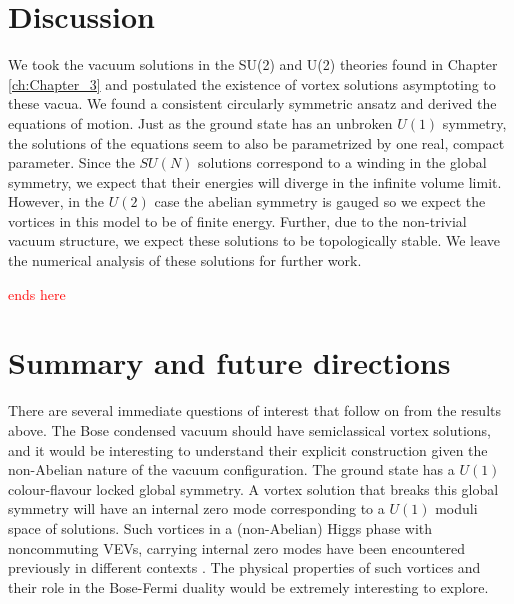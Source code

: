     \section{Discussion}
    We took the vacuum solutions in the SU(2) and U(2) theories found in Chapter \ref{ch:Chapter_3} and postulated the existence of vortex solutions asymptoting to these vacua. We found a consistent circularly symmetric ansatz and derived the equations of motion. Just as the ground state has an unbroken $U(1)$ symmetry, the solutions of the equations seem to also be parametrized by one real, compact parameter. Since the $SU(N)$ solutions correspond to a winding in the global symmetry, we expect that their energies will diverge in the infinite volume limit. However, in the $U(2)$ case the abelian symmetry is gauged so we expect the vortices in this model to be of finite energy. Further, due to the non-trivial vacuum structure, we expect these solutions to be topologically stable. We leave the numerical analysis of these solutions for further work.


\textcolor{red}{ends here}
\section{Summary and future directions}
\label{sec5}
There are several immediate questions of interest that follow on from the results above.
The Bose condensed vacuum should have semiclassical vortex solutions, and it would be interesting to understand their explicit construction given the non-Abelian nature of the vacuum configuration. The ground state has a $U(1)$ colour-flavour locked global symmetry. A vortex solution that breaks this global symmetry will have an internal zero mode corresponding to a $U(1)$ moduli space of solutions.  Such vortices in a (non-Abelian) Higgs phase with noncommuting VEVs, carrying internal zero modes have been encountered previously in different contexts \cite{Markov:2004mj, Auzzi:2008ep, Auzzi:2009es}. The physical properties of such vortices and their role in the Bose-Fermi duality would be extremely interesting to explore.

